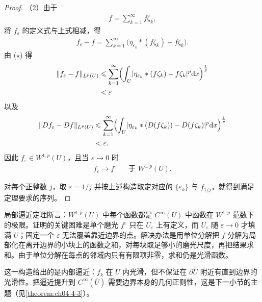 \documentclass[../../main.tex]{subfiles}%
\begin{document}
\begin{proof}
（2）由于
\begin{align*}
f=\sum_{k=1}^{\infty}f\zeta_k,
\end{align*}
将 $f_\varepsilon$ 的定义式与上式相减，得
\begin{align*}
f_\varepsilon-f=\sum_{k=1}^{\infty}\bigl(\eta_{\varepsilon_k}*(f\zeta_k)-f\zeta_k\bigr).
\end{align*}
由 ($\star$) 得
\begin{align*}
\lVert f_\varepsilon-f\rVert_{L^p(U)}
&\leqslant\sum_{k=1}^{\infty}\Bigl(\int_U\lvert\eta_{\varepsilon_k}*(f\zeta_k)-f\zeta_k\rvert^p\mathrm{d} x\Bigr)^{\frac1p}\\
&<\varepsilon
\end{align*}
以及
\begin{align*}
\lVert Df_\varepsilon-Df\rVert_{L^p(U)}
&\leqslant\sum_{k=1}^{\infty}\Bigl(\int_U\lvert\eta_{\varepsilon_k}*(D(f\zeta_k))-D(f\zeta_k)\rvert^p\mathrm{d} x\Bigr)^{\frac1p}\\
&<\varepsilon.
\end{align*}
因此 $f_\varepsilon\in W^{1,p}(U)$，且当 $\varepsilon\to0$ 时
\begin{align*}
f_\varepsilon\to f\qquad\text{于 }W^{1,p}(U).
\end{align*}

对每个正整数 $j$，取 $\varepsilon=1/j$ 并按上述构造取定对应的 $\{\varepsilon_k\}$ 与 $f_{1/j}$，就得到满足定理要求的序列。
\end{proof}

\begin{remark}\label{remark:ch04-thm-4-2-动机}
局部逼近定理断言：$W^{1,p}(U)$ 中每个函数都是 $C^\infty(U)$ 中函数在 $W^{1,p}$ 范数下的极限。证明的关键困难是单个磨光 $f^\varepsilon$ 只在 $U_\varepsilon$ 上有定义，而 $U_\varepsilon$ 随 $\varepsilon\to0$ 才填满 $U$；固定一个 $\varepsilon$ 无法覆盖靠近边界的点。解决办法是用单位分解把 $f$ 分解为局部化在离开边界的小块上的函数之和，对每块取足够小的磨光尺度，再把结果求和。由于单位分解在每点的邻域内只有有限项非零，求和仍是光滑函数。

这一构造给出的是内部逼近：$f_k$ 在 $U$ 内光滑，但不保证在 $\partial U$ 附近有直到边界的光滑性。把逼近提升到 $C^\infty(\overline{U})$ 需要边界本身的几何正则性，这是下一小节的主题（见\cref{theorem:ch04-4-3}）。%
\end{remark}
\end{document}
